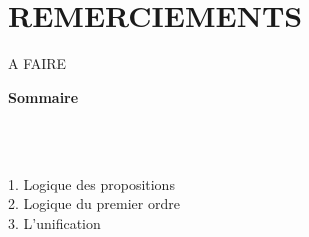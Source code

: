 \documentclass[11pt]{article}
\begin{document}
\newpage
\section*{REMERCIEMENTS}
A FAIRE
\vspace*{\fill}

\newpage %
\begin{titlepage}
    \vspace*{\fill} %

    \begin{center}
        {\Large\bfseries\color{sectioncolor} Sommaire} \\
        \vspace{0.8cm}

        \begin{minipage}{0.8\textwidth}
             \dotfill \pageref{introduction} \\ 
            \vspace{0.5cm}

             \dotfill \pageref{generalites} \\[1em]
            \hspace*{2.8em}1. Logique des propositions \dotfill \pageref{lp} \\[0.5em]
            \hspace*{2.8em}2. Logique du premier ordre \dotfill \pageref{lpo} \\[0.5em]
            \hspace*{2.8em}3. L'unification \dotfill \pageref{unification}


\end{minipage}
\end{center}
\end{titlepage}
\end{document}
